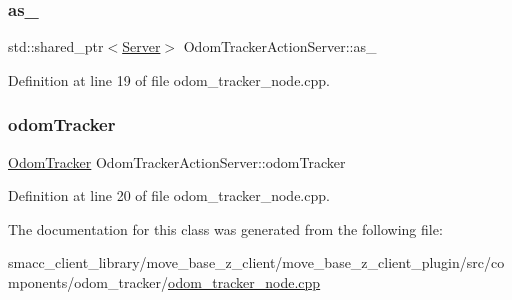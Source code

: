 \subsubsection{\texorpdfstring{as\+\_\+}{as\_}}
{\footnotesize\ttfamily std\+::shared\+\_\+ptr$<$\hyperlink{odom__tracker__node_8cpp_a9884574d0480319430f628f79afc0500}{Server}$>$ Odom\+Tracker\+Action\+Server\+::as\+\_\+}



Definition at line 19 of file odom\+\_\+tracker\+\_\+node.\+cpp.

\mbox{\label{classOdomTrackerActionServer_a3e5c4328d3206fbd2fd2708f0aefe651}} 
\subsubsection{\texorpdfstring{odom\+Tracker}{odomTracker}}
{\footnotesize\ttfamily \hyperlink{classcl__move__base__z_1_1odom__tracker_1_1OdomTracker}{Odom\+Tracker} Odom\+Tracker\+Action\+Server\+::odom\+Tracker}



Definition at line 20 of file odom\+\_\+tracker\+\_\+node.\+cpp.



The documentation for this class was generated from the following file\+:\begin{DoxyCompactItemize}
\item 
smacc\+\_\+client\+\_\+library/move\+\_\+base\+\_\+z\+\_\+client/move\+\_\+base\+\_\+z\+\_\+client\+\_\+plugin/src/components/odom\+\_\+tracker/\hyperlink{odom__tracker__node_8cpp}{odom\+\_\+tracker\+\_\+node.\+cpp}\end{DoxyCompactItemize}
